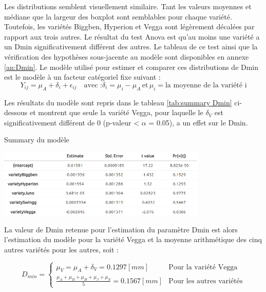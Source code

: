 Les distributions semblent visuellement similaire.
Tant les valeurs moyennes et médiane que la largeur des boxplot sont semblables pour chaque variété.
Toutefois, les variétés Biggben, Hyperion et Vegga sont légèrement décalées par rapport aux trois autres.
Le résultat du test Anova est qu'au moins une variété a un Dmin significativement différent des autres.
Le tableau de ce test ainsi que la vérification des hypothèses sous-jacente au modèle sont disponibles en annexe \ref{an:Dmin}.
Le modèle utilisé pour estimer et comparer ces distributions de Dmin est le modèle à un facteur catégoriel fixe suivant :
\begin{equation}
    Y_{ij} = \mu_{A}+\delta_{i}+\epsilon_{ij} \quad \text{avec :} \delta_{i}=\mu_{i}-\mu_{A} \, \text{et} \, \mu_{i} = \text{la moyenne de la variété i}
\end{equation}

Les résultats du modèle sont repris dans le tableau \ref{tab:summary Dmin} ci-dessous et montrent que seule la variété Vegga, pour laquelle le $\delta_{V}$ est significativement différent de 0 (p-valeur < $\alpha$ = 0.05), a un effet sur le Dmin.

\begin{table}[ht]
    \centering
    \caption{Summary du modèle}
    \includegraphics[width=0.75\textwidth]{Image/summary Dmin.png}
    \label{tab:summary Dmin}
\end{table}

La valeur de Dmin retenue pour l'estimation du paramètre Dmin est alors l'estimation du modèle pour la variété Vegga et la moyenne arithmétique des cinq autres variétés pour les autres, soit :

\begin{equation}
    D_{min} = 
    \begin{cases}
        \mu_{V} = \mu_{A}+\delta_{V} = 0.1297 [mm] & \text{Pour la variété Vegga} \\
        \frac{\mu_{A}+\mu_{B}+\mu_{H}+\mu_{J}+\mu_{S}}{5}=0.1567 [mm] & \text{Pour les autres variétés}
    \end{cases}
\end{equation}

